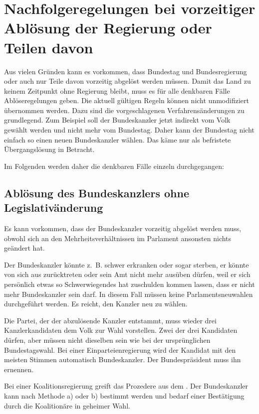 \section{Nachfolgeregelungen bei vorzeitiger Ablösung der Regierung oder Teilen davon}\label{sec:abloseregelungen}

Aus vielen Gründen kann es vorkommen, dass Bundestag und Bundesregierung oder auch nur Teile davon
vorzeitig abgelöst werden müssen.
Damit das Land zu keinem Zeitpunkt ohne Regierung bleibt, muss es für alle denkbaren Fälle Ablöseregelungen geben.
Die aktuell gültigen Regeln können nicht unmodifiziert übernommen werden.
Dazu sind die vorgeschlagenen Verfahrensänderungen zu grundlegend.
Zum Beispiel soll der Bundeskanzler jetzt indirekt vom Volk gewählt werden und nicht mehr vom Bundestag.
Daher kann der Bundestag nicht einfach so einen neuen Bundeskanzler wählen.
Das käme nur als befristete Übergangslösung in Betracht.

Im Folgenden werden daher die denkbaren Fälle einzeln durchgegangen:

\subsection{Ablösung des Bundeskanzlers ohne Legislativänderung}\label{subsec:ablosung-des-bundeskanzlers-ohne-legislativanderung}
Es kann vorkommen, dass der Bundeskanzler vorzeitig abgelöst werden muss, obwohl sich an den Mehrheitsverhältnissen im Parlament
ansonsten nichts geändert hat.

Der Bundeskanzler könnte z.~B. schwer erkranken oder sogar sterben, er könnte von sich aus zurücktreten
oder sein Amt nicht mehr ausüben dürfen, weil er sich persönlich etwas so Schwerwiegendes hat zuschulden kommen lassen,
dass er nicht mehr Bundeskanzler sein darf.
In diesem Fall müssen keine Parlamentsneuwahlen durchgeführt werden.
Es reicht, den Kanzler neu zu wählen.

Die Partei, der der abzulösende Kanzler entstammt, muss wieder drei Kanzlerkandidaten dem Volk zur Wahl
vorstellen.
Zwei der drei Kandidaten dürfen, aber müssen nicht dieselben sein wie bei der ursprünglichen Bundestagswahl.
Bei einer Einparteienregierung wird der Kandidat mit den meisten Stimmen automatisch Bundeskanzler.
Der Bundespräsident muss ihn ernennen.

Bei einer Koalitionsregierung greift das Prozedere aus dem .
Der Bundeskanzler kann nach Methode a) oder b) bestimmt werden und bedarf einer Bestätigung durch die Koalitionäre
in geheimer Wahl.

